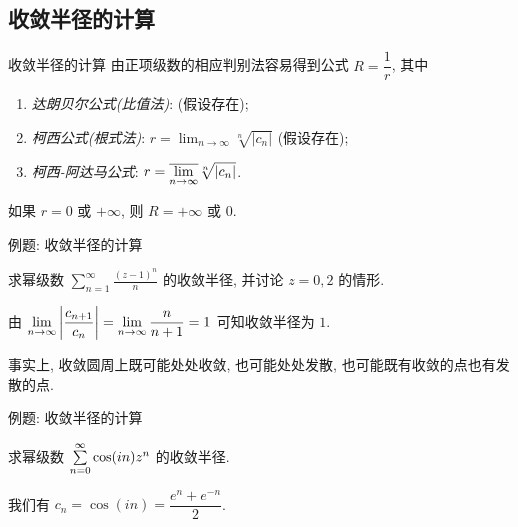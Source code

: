 \subsection{收敛半径的计算}
\begin{frame}{收敛半径的计算}
\onslide<+->
由正项级数的相应判别法容易得到公式 $R=\dfrac1r$, 其中
\begin{enumerate}
\item \emph{达朗贝尔公式(比值法)}:  (假设存在);
\item \emph{柯西公式(根式法)}: $r=\displaystyle\lim_{n\to\infty}\sqrt[n]{|c_n|}$ (假设存在);
\item \emph{柯西-阿达马公式}: $r=\displaystyle\overline{\lim_{n\to\infty}} \sqrt[n]{|c_n|}$.
\end{enumerate}
\onslide<+->
如果 $r=0$ 或 $+\infty$, 则 $R=+\infty$ 或 $0$.
\end{frame}


\begin{frame}{例题: 收敛半径的计算}
\onslide<+->
\begin{example}
求幂级数 $\displaystyle\sum_{n=1}^\infty\frac{(z-1)^n}n$ 的收敛半径, 并讨论 $z=0,2$ 的情形.
\end{example}
\onslide<+->
\begin{solution}
由 $\displaystyle\lim_{n\to\infty}\left|\frac{c_{n+1}}{c_n}\right|=\lim_{n\to\infty}\frac n{n+1}=1$ 可知收敛半径为 $1$.


\end{solution}
\onslide<+->
事实上, \alert{收敛圆周上既可能处处收敛, 也可能处处发散, 也可能既有收敛的点也有发散的点}.
\end{frame}


\begin{frame}{例题: 收敛半径的计算}
\onslide<+->
\begin{example}
求幂级数 $\sum\limits_{n=0}^\infty\cos(in)z^n$ 的收敛半径.
\end{example}
\onslide<+->
\begin{solution}
我们有 $c_n=\cos(in)=\dfrac{e^n+e^{-n}}2$.
\end{solution}
\end{frame}



